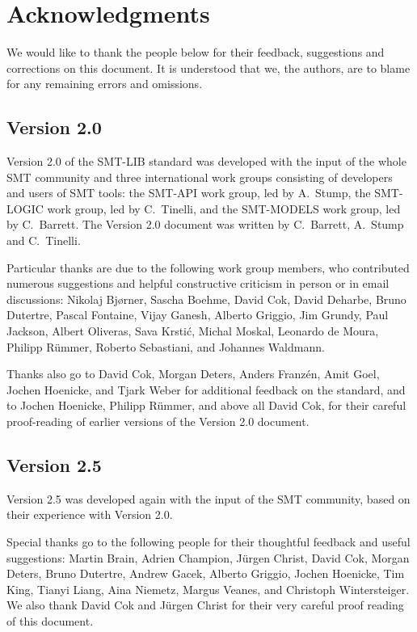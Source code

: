 
\chapter*{Acknowledgments}

\thispagestyle{empty}

We would like to thank the people below for their feedback, suggestions and corrections
on this document.
It is understood that we, the authors, are to blame for any remaining errors
and omissions.


\section*{Version 2.0}

Version 2.0 of the SMT-LIB standard was developed with the input of 
the whole SMT community and
three international work groups consisting of developers and users of SMT tools:
the SMT-API work group, led by A.~Stump,
the SMT-LOGIC work group, led by C.~Tinelli, and
the SMT-MODELS work group, led by C.~Barrett.
The Version 2.0 document was written by  C.~Barrett, A.~Stump and C.~Tinelli.

Particular thanks are due to the following work group members, 
who contributed numerous suggestions and helpful constructive criticism 
in person or in email discussions:
Nikolaj Bj{\o}rner, 
Sascha Boehme, 
David Cok, 
David Deharbe, 
Bruno Dutertre,
Pascal Fontaine,
Vijay Ganesh,
Alberto Griggio,
Jim Grundy,
Paul Jackson, 
Albert Oliveras, 
Sava Krsti\'c,
Michal Moskal, 
Leonardo de Moura,
Philipp R\"ummer,
Roberto Sebastiani,
and
Johannes Waldmann.

Thanks also go to
David Cok,
Morgan Deters,
Anders Franz\'en,
Amit Goel,
Jochen Hoenicke,
and
Tjark Weber
for additional feedback on the standard,
and to Jochen Hoenicke, Philipp R\"ummer,
and above all David Cok,
for their careful proof-reading of earlier versions of the Version 2.0 document.

\section*{Version 2.5}

Version 2.5 was developed again with the input of the SMT community, 
based on their experience with Version 2.0.

Special thanks go to the following people
for their thoughtful feedback and useful suggestions:
Martin Brain,
Adrien Champion,
J{\"u}rgen Christ,
David Cok,
Morgan Deters,
Bruno Dutertre,
Andrew Gacek,
Alberto Griggio,
Jochen Hoenicke,
Tim King,
Tianyi Liang,
Aina Niemetz,
Margus Veanes,
and
Christoph Wintersteiger.
We also thank David Cok and J\"{u}rgen Christ for their very careful 
proof reading of this document.


